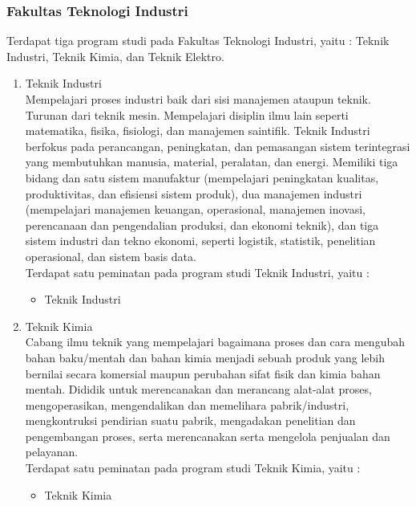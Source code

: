 \subsubsection{Fakultas Teknologi Industri}
Terdapat tiga program studi pada Fakultas Teknologi Industri, yaitu : Teknik Industri, Teknik Kimia, dan Teknik Elektro.
	\begin{enumerate}
		\item Teknik Industri\\
			Mempelajari proses industri baik dari sisi manajemen ataupun teknik. Turunan dari teknik mesin. Mempelajari disiplin ilmu lain seperti matematika, fisika, fisiologi, dan manajemen saintifik. Teknik Industri berfokus pada perancangan, peningkatan, dan pemasangan sistem terintegrasi yang membutuhkan manusia, material, peralatan, dan energi. Memiliki tiga bidang dan satu sistem manufaktur (mempelajari peningkatan kualitas, produktivitas, dan efisiensi sistem produk), dua manajemen industri (mempelajari manajemen keuangan, operasional, manajemen inovasi, perencanaan dan pengendalian produksi, dan ekonomi teknik), dan tiga sistem industri dan tekno ekonomi, seperti logistik, statistik, penelitian operasional, dan sistem basis data.\\
			
			Terdapat satu peminatan pada program studi Teknik Industri, yaitu :
			
			\begin{itemize}
				\item Teknik Industri
			\end{itemize}\leavevmode
			
		\item Teknik Kimia\\
			Cabang ilmu teknik yang mempelajari bagaimana proses dan cara mengubah bahan baku/mentah dan bahan kimia menjadi sebuah produk yang lebih bernilai secara komersial maupun perubahan sifat fisik dan kimia bahan mentah. Dididik untuk merencanakan dan merancang alat-alat proses, mengoperasikan, mengendalikan dan memelihara pabrik/industri, mengkontruksi pendirian suatu pabrik, mengadakan penelitian dan pengembangan proses, serta merencanakan serta mengelola penjualan dan pelayanan.\\
			
			Terdapat satu peminatan pada program studi Teknik Kimia, yaitu :
			
			\begin{itemize}
				\item Teknik Kimia
			\end{itemize}\leavevmode


\end{enumerate}
